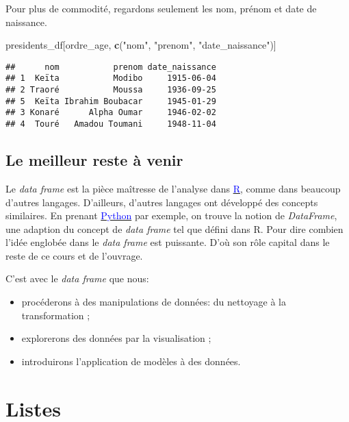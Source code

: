 \documentclass[]{book}
\newenvironment{Shaded}{\begin{snugshade}}{\end{snugshade}}
\newcommand{\KeywordTok}[1]{\textcolor[rgb]{0.13,0.29,0.53}{\textbf{#1}}}
\newcommand{\StringTok}[1]{\textcolor[rgb]{0.31,0.60,0.02}{#1}}
\newcommand{\NormalTok}[1]{#1}
\begin{document}
Pour plus de commodité, regardons seulement les nom, prénom et date de
naissance.

\begin{Shaded}
\begin{Highlighting}[]
\NormalTok{presidents_df[ordre_age, }\KeywordTok{c}\NormalTok{(}\StringTok{"nom"}\NormalTok{, }\StringTok{"prenom"}\NormalTok{, }\StringTok{"date_naissance"}\NormalTok{)]}
\end{Highlighting}
\end{Shaded}

\begin{verbatim}
##      nom           prenom date_naissance
## 1  Keïta           Modibo     1915-06-04
## 2 Traoré           Moussa     1936-09-25
## 5  Keïta Ibrahim Boubacar     1945-01-29
## 3 Konaré      Alpha Oumar     1946-02-02
## 4  Touré   Amadou Toumani     1948-11-04
\end{verbatim}

\subsection{Le meilleur reste à venir}\label{le-meilleur-reste-a-venir}

Le \emph{data frame} est la pièce maîtresse de l'analyse dans
\href{http://r-project.org}{\textcolor{blue}{R}}, comme dans beaucoup
d'autres langages. D'ailleurs, d'autres langages ont développé des
concepts similaires. En prenant
\href{https://www.python.org/}{\textcolor{blue}{Python}} par exemple, on
trouve la notion de \emph{DataFrame}, une adaption du concept de
\emph{data frame} tel que défini dans R. Pour dire combien l'idée
englobée dans le \emph{data frame} est puissante. D'où son rôle capital
dans le reste de ce cours et de l'ouvrage.

C'est avec le \emph{data frame} que nous:

\begin{itemize}
\item
  procéderons à des manipulations de données: du nettoyage à la
  transformation ;
\item
  explorerons des données par la visualisation ;
\item
  introduirons l'application de modèles à des données.
\end{itemize}

\section{Listes}\label{listes}
\end{document}
